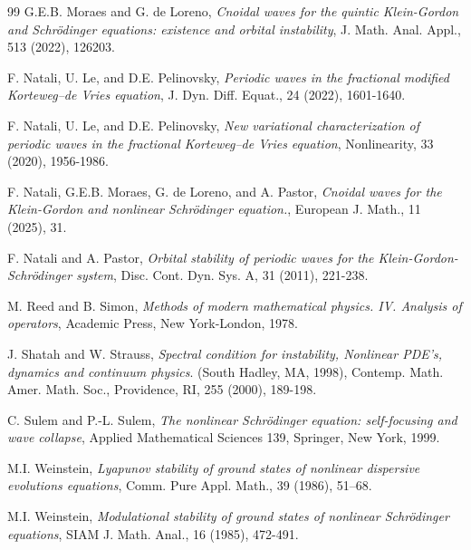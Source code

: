 \documentclass[12pt,reqno,a4paper]{amsart} %
\numberwithin{equation}{section}
\numberwithin{figure}{section}
\begin{document}
\begin{thebibliography}{99}
 G.E.B. Moraes and G. de Loreno, \textit{Cnoidal waves for the quintic Klein-Gordon and Schr\"odinger equations: existence and orbital instability}, J. Math. Anal. Appl., 513 (2022), 126203.


 F. Natali, U. Le, and D.E. Pelinovsky, \textit{Periodic waves in the fractional modified Korteweg–de Vries equation}, J. Dyn. Diff. Equat., 24 (2022), 1601-1640.



 F. Natali, U. Le, and D.E. Pelinovsky, \textit{New variational characterization of periodic waves in the fractional Korteweg–de Vries equation}, Nonlinearity, 33 (2020), 1956-1986.

 F. Natali, G.E.B. Moraes, G. de Loreno, and A. Pastor, \textit{Cnoidal waves for the Klein-Gordon and nonlinear Schr\"odinger equation.}, European J. Math., 11 (2025), 31.


 F. Natali and A. Pastor, \textit{Orbital stability of periodic waves for the Klein-Gordon-Schrödinger system}, Disc. Cont. Dyn. Sys. A, 31 (2011), 221-238.


 M. Reed and B. Simon,   \textit{Methods of modern mathematical physics. IV. Analysis of operators}, Academic Press, New York-London, 1978.



 J. Shatah and W. Strauss, \textit{Spectral condition for instability, Nonlinear PDE's, dynamics and continuum physics}. (South Hadley, MA, 1998), Contemp. Math. Amer. Math. Soc., Providence, RI, 255 (2000), 189-198.

 C. Sulem and P.-L. Sulem, \textit{The nonlinear Schrödinger equation: self-focusing and wave collapse}, Applied Mathematical Sciences 139, Springer, New York, 1999.



 M.I. Weinstein, \textit{Lyapunov stability of ground states of nonlinear dispersive evolutions equations},  Comm. Pure Appl. Math., 39 (1986), 51--68.


 M.I. Weinstein, \textit{Modulational stability of ground states of nonlinear Schrödinger equations}, SIAM J. Math. Anal., 16 (1985), 472-491.


\end{thebibliography}
\end{document}
